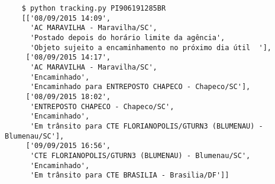 \documentclass{../sftex/sftex}
\begin{document}
\begin{verbatim}
    $ python tracking.py PI906191285BR
    [['08/09/2015 14:09',
      'AC MARAVILHA - Maravilha/SC',
      'Postado depois do horário limite da agência',
      'Objeto sujeito a encaminhamento no próximo dia útil  '],
     ['08/09/2015 14:17',
      'AC MARAVILHA - Maravilha/SC',
      'Encaminhado',
      'Encaminhado para ENTREPOSTO CHAPECO - Chapeco/SC'],
     ['08/09/2015 18:02',
      'ENTREPOSTO CHAPECO - Chapeco/SC',
      'Encaminhado',
      'Em trânsito para CTE FLORIANOPOLIS/GTURN3 (BLUMENAU) - Blumenau/SC'],
     ['09/09/2015 16:56',
      'CTE FLORIANOPOLIS/GTURN3 (BLUMENAU) - Blumenau/SC',
      'Encaminhado',
      'Em trânsito para CTE BRASILIA - Brasilia/DF']]
\end{verbatim}
\end{document}
